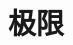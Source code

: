 \documentclass[12pt,a4paper,oneside]{ctexbook}
\begin{document}
\else%
\fi

\chapter{极限}

\ifx\allfiles\undefined %
\end{document}
